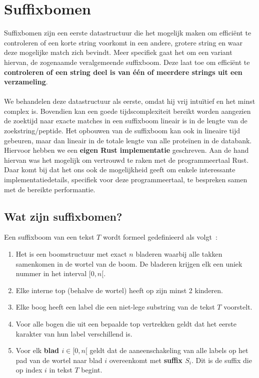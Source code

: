 \chapter{Suffixbomen}\label{ch:suffix-bomen}
Suffixbomen zijn een eerste datastructuur die het mogelijk maken om efficiënt te controleren of een korte string voorkomt in een andere, grotere string en waar deze mogelijke match zich bevindt.
Meer specifiek gaat het om een variant hiervan, de zogenaamde veralgemeende suffixboom.
Deze laat toe om efficiënt te \textbf{controleren of een string deel is van één of meerdere strings uit een verzameling}.
\\ \\
We behandelen deze datastructuur als eerste, omdat hij vrij intuïtief en het minst complex is.
Bovendien kan een goede tijdscomplexiteit bereikt worden aangezien de zoektijd naar exacte matches in een suffixboom lineair is in de lengte van de zoekstring/peptide.
Het opbouwen van de suffixboom kan ook in lineaire tijd gebeuren, maar dan lineair in de totale lengte van alle proteïnen in de databank.
Hiervoor hebben we een \textbf{eigen Rust implementatie} geschreven.
Aan de hand hiervan was het mogelijk om vertrouwd te raken met de programmeertaal Rust.
Daar komt bij dat het ons ook de mogelijkheid geeft om enkele interessante implementatiedetails, specifiek voor deze programmeertaal, te bespreken samen met de bereikte performantie.

\section{Wat zijn suffixbomen?}\label{sec:wat-zijn-suffix-bomen?}
Een suffixboom van een tekst $T$ wordt formeel gedefinieerd als volgt~\cite{CCB_course}:
\begin{enumerate}
    \item Het is een boomstructuur met exact $n$ bladeren waarbij alle takken samenkomen in de wortel van de boom.
    De bladeren krijgen elk een uniek nummer in het interval $[0, n[$.
    \item Elke interne top (behalve de wortel) heeft op zijn minst 2 kinderen.
    \item Elke boog heeft een label die een niet-lege substring van de tekst $T$ voorstelt.
    \item Voor alle bogen die uit een bepaalde top vertrekken geldt dat het eerste karakter van hun label verschillend is.
    \item Voor elk \textbf{blad $i \in [0, n[$} geldt dat de aaneenschakeling van alle labels op het pad van de wortel naar blad $i$ overeenkomt met \textbf{suffix $S_i$}.
    Dit is de suffix die op index $i$ in tekst $T$ begint.
\end{enumerate}

